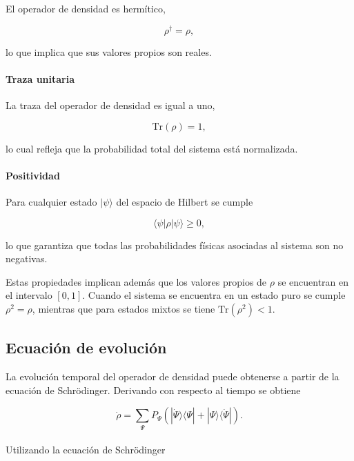 \documentclass[11pt]{report}
\begin{document}
El operador de densidad es hermítico,

\begin{equation}
\rho^\dagger = \rho,
\end{equation}

lo que implica que sus valores propios son reales.

\paragraph{Traza unitaria}

La traza del operador de densidad es igual a uno,

\begin{equation}
\mathrm{Tr}(\rho) = 1,
\end{equation}

lo cual refleja que la probabilidad total del sistema está normalizada.

\paragraph{Positividad}

Para cualquier estado $|\psi\rangle$ del espacio de Hilbert se cumple

\begin{equation}
\langle \psi|\rho|\psi\rangle \ge 0,
\end{equation}

lo que garantiza que todas las probabilidades físicas asociadas al sistema son no negativas.

Estas propiedades implican además que los valores propios de $\rho$ se encuentran en el intervalo $[0,1]$. Cuando el sistema se encuentra en un estado puro se cumple $\rho^2=\rho$, mientras que para estados mixtos se tiene $\mathrm{Tr}(\rho^2)<1$.

\subsection{Ecuación de evolución}

La evolución temporal del operador de densidad puede obtenerse a partir de la ecuación de Schrödinger. Derivando con respecto al tiempo se obtiene

\begin{equation}
\dot{\rho} =
\sum_{\Psi} P_{\Psi}
\left(
|\dot{\Psi}\rangle\langle\Psi|
+
|\Psi\rangle\langle\dot{\Psi}|
\right).
\end{equation}
\\
Utilizando la ecuación de Schrödinger
\end{document}
